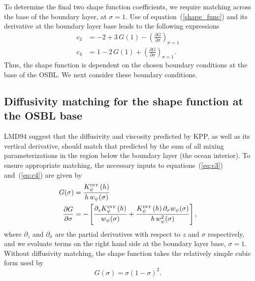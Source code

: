 \documentclass[preprint,12pt,authoryear]{agujournal}
\begin{document}
To determine the final two shape function coefficients, we require  matching across the base of the boundary layer, at $\sigma=1$.  Use of equation~(\ref{shape_func}) and its derivative at the boundary layer base leads to the following expressions
\begin{subequations}
\begin{align}
c_3 &= -2 + 3\, G(1) - \left( \frac{\partial G}{\partial \sigma} \right)_{\sigma=1} 
\label{eq:c3}
\\
c_4 &= 1 - 2\, G(1) + \left( \frac{\partial G}{\partial \sigma} \right)_{\sigma=1}.
\label{eq:c4}
\end{align}
\end{subequations} 
Thus, the shape function is dependent on the chosen boundary conditions at the base of the OSBL.  We next consider these boundary conditions.  

\subsection{Diffusivity matching for the shape function at the OSBL base}
\label{subsection:diffusivity-matching-shape-function}

LMD94 suggest that the diffusivity and viscosity predicted by KPP, as well as its vertical derivative, should match that predicted by the sum of all 
mixing parameterizations in the region below the boundary layer (the ocean interior). To ensure appropriate matching, the necessary inputs to equations~(\ref{eq:c3}) and~(\ref{eq:c4}) are given by 
\begin{subequations}
\begin{align}
\label{internalMatching1}
G(\sigma) &= \frac{K_\psi^{\mbox{\tiny INT}} \left(h \right)}{h \, w_\psi(\sigma)}
\\
\label{internalMatching2}
\frac{\partial G}{\partial \sigma} &= -\left[
 \frac{\partial_z K_\psi^{\mbox{\tiny INT}}  \left(h\right)}{w_\psi(\sigma)} + \frac{K_\psi^{\mbox{\tiny INT}}\left(h\right) \partial_{\sigma} w_\psi(\sigma)}{h\,w_\psi^2(\sigma)}
 \right], 
\end{align}
\end{subequations}
 where $\partial_z$ and $\partial_\sigma$ are the partial derivatives with respect to $z$ and $\sigma$ respectively, and we evaluate terms on the right hand side at the boundary layer base, $\sigma=1$. Without diffusivity matching, the shape function takes the relatively simple cubic form used by \cite{troen1986simple}
\begin{equation}
\label{simpleshapesEqn}
G\left(\sigma\right) = \sigma \left(1-\sigma\right)^2. 
\end{equation}
\end{document}

